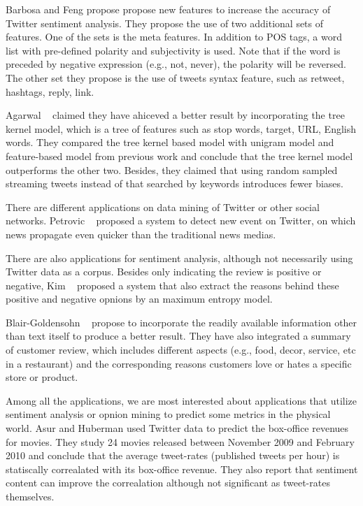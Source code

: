 \documentclass[12pt]{article}
\begin{document}
Barbosa and Feng \cite{Barbosa:10} propose propose new features to increase the accuracy of Twitter sentiment analysis. They propose the use of two additional sets of features. One of the sets is the meta features. In addition to POS tags, a word list with pre-defined polarity and subjectivity is used. Note that if the word is preceded by negative expression (e.g., not, never), the polarity will be reversed. The other set they propose is the use of tweets syntax feature, such as retweet, hashtags, reply, link.

Agarwal \etal~\cite{Agarwal:11} claimed they have ahiceved a better result by incorporating the tree kernel model, which is a tree of features such as stop words, target, URL, English words. They compared the tree kernel based model with unigram model and feature-based model from previous work and conclude that the tree kernel model outperforms the other two. Besides, they claimed that using random sampled streaming tweets instead of that searched by keywords introduces fewer biases.

There are different applications on data mining of Twitter or other social networks. Petrovic \etal~\cite{Petrovic:10} proposed a system to detect new event on Twitter, on which news propagate even quicker than the traditional news medias.

There are also applications for sentiment analysis, although not necessarily using Twitter data as a corpus. Besides only indicating the review is positive or negative, Kim \etal~\cite{Kim:06} proposed a system that also extract the reasons behind these positive and negative opnions by an maximum entropy model.

Blair-Goldensohn \etal~\cite{Blair:08} propose to incorporate the readily available information other than text itself to produce a better result. They have also integrated a summary of customer review, which includes different aspects (e.g., food, decor, service, etc in a restaurant) and the corresponding reasons customers love or hates a specific store or product.

Among all the applications, we are most interested about applications that utilize sentiment analysis or opnion mining to predict some metrics in the physical world. Asur and Huberman \cite{Asur:10} used Twitter data to predict the box-office revenues for movies. They study 24 movies released between November 2009 and February 2010 and conclude that the average tweet-rates (published tweets per hour) is statiscally correalated with its box-office revenue. They also report that sentiment content can improve the correalation although not significant as tweet-rates themselves.
\end{document}
